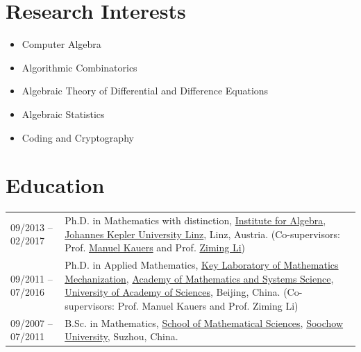 \documentclass[a4paper,12pt]{article}
\begin{document}
\section*{\Large{Research Interests}}
\begin{itemize}
\item  Computer Algebra
\item Algorithmic Combinatorics
\item Algebraic Theory of Differential and Difference Equations
\item Algebraic Statistics
\item Coding and Cryptography
\end{itemize}

\section*{\Large{Education}}
\begin{tabular}{@{}p{1.4in}p{4in}}
09/2013 -- 02/2017    & Ph.D. in Mathematics with distinction, 
                        \href{http://www.jku.at/algebra/content}{Institute for Algebra}, 
                        \href{http://www.jku.at/content}{Johannes Kepler University Linz}, Linz, Austria. 
                        (Co-supervisors: Prof. \href{http://www.kauers.de/}{Manuel Kauers} and 
                        Prof. \href{http://mmrc.iss.ac.cn/~zmli/}{Ziming Li})\\
09/2011 -- 07/2016    & Ph.D. in Applied Mathematics, 
                        \href{http://english.mmrc.amss.cas.cn/}{Key Laboratory of Mathematics Mechanization}, 
                        \href{http://english.amss.cas.cn/}{Academy of Mathematics and Systems Science}, 
                        \href{http://english.ucas.ac.cn/}{University of Academy of Sciences}, Beijing, China. 
                        (Co-supervisors: Prof. Manuel Kauers and Prof. Ziming Li)\\
09/2007 -- 07/2011    & B.Sc. in Mathematics, \href{http://math.suda.edu.cn/}{School of Mathematical Sciences}, 
                        \href{http://eng.suda.edu.cn/}{Soochow University}, Suzhou, China.  
\end{tabular} \\
\end{document}
